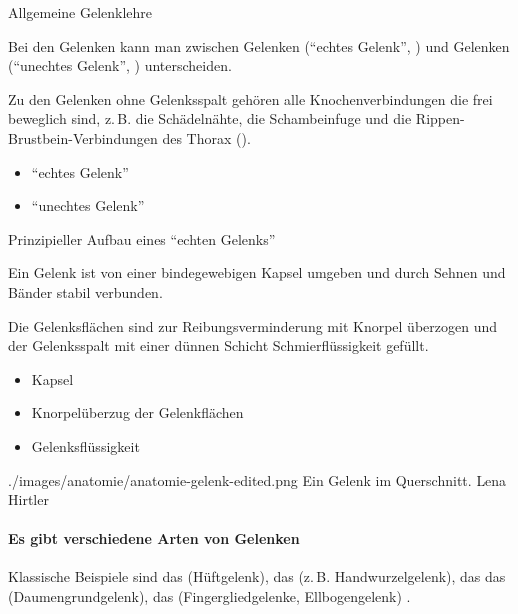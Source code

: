 {Allgemeine Gelenklehre}
{Bei den Gelenken kann man zwischen Gelenken  ("`echtes
Gelenk"', ) und Gelenken  ("`unechtes
Gelenk"', ) unterscheiden.

Zu den Gelenken ohne Gelenksspalt gehören alle Knochenverbindungen die 
frei beweglich sind, z.\,B. die Schädelnähte, die Schambeinfuge und die
Rippen-Brustbein-Verbindungen des Thorax ().

}
{%
\begin{itemize}
  \item "`echtes Gelenk"'
  \item "`unechtes Gelenk"'
\end{itemize}
}{}{}{}

{Prinzipieller Aufbau eines "`echten Gelenks"'}
{%
Ein Gelenk ist von einer bindegewebigen Kapsel umgeben und durch
Sehnen und Bänder stabil verbunden.

Die Gelenksflächen sind zur Reibungs\-ver\-minderung mit 
Knorpel überzogen und der Gelenksspalt mit einer dünnen Schicht 
Schmierflüssigkeit  gefüllt. 
}{%
\begin{itemize}
  \item Kapsel
  \item Knorpelüberzug der Gelenkflächen
  \item Gelenksflüssigkeit
\end{itemize}
}
{./images/anatomie/anatomie-gelenk-edited.png}
{Ein Gelenk im Querschnitt.}
{Lena Hirtler}


\paragraph{Es gibt verschiedene Arten von Gelenken}

Klassische Beispiele sind das 
 (Hüftgelenk),
 das  (z.\,B. Handwurzelgelenk),
das das  (Daumengrundgelenk), 
das  (Fingergliedgelenke, Ellbogengelenk) .


